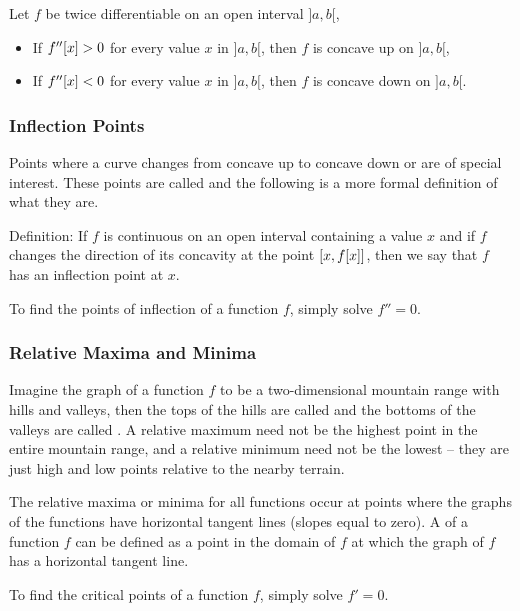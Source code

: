 \begin{note}
Let $f$ be twice differentiable on an open interval $]a, b[$,
\end{note}

\begin{itemize}
\item If $f''\!\left[{x}\right] > 0$ for every value $x$ in $]a,b[$, then $f$ is concave up on $]a,b[$,
\item If $f''\!\left[{x}\right] < 0$ for every value $x$ in $]a,b[$, then $f$ is concave down on $]a,b[$.
\end{itemize}


\subsubsection{Inflection Points} 
Points where a curve changes from concave up to concave down or \vis are of special interest. These points are called  and the following is a more formal definition of what they are.

Definition: If $f$ is continuous on an open interval containing a value $x$ and if $f$ changes the direction of its concavity at the point $\left[{x,f\!\left[{x}\right]}\right]$, then we say that $f$ has an inflection point at $x$.

\begin{note}
To find the points of inflection of a function $f$, simply solve $f'' = 0$.
\end{note}


\subsubsection{Relative Maxima and Minima} Imagine the graph of a function $f$ to be a two-dimensional mountain range with hills and valleys, then the tops of the hills are called  and the bottoms of the valleys are called . A relative maximum need not be the highest point in the entire mountain range, and a relative minimum need not be the lowest -- they are just high and low points relative to the nearby terrain.

The relative maxima or minima for all functions occur at points where the graphs of the functions have horizontal tangent lines (slopes equal to zero). A  of a function $f$ can be defined as a point in the domain of $f$ at which the graph of $f$ has a horizontal tangent line.

\begin{note}
To find the critical points of a function $f$, simply solve $f' = 0$.
\end{note}



